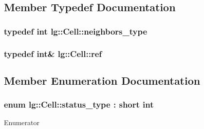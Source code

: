 \subsection{Member Typedef Documentation}
\subsubsection[{\texorpdfstring{neighbors\+\_\+type}{neighbors_type}}]{\setlength{\rightskip}{0pt plus 5cm}typedef int {\bf lg\+::\+Cell\+::neighbors\+\_\+type}}\hypertarget{classlg_1_1Cell_aa88691e430082878fa8092c25865ab53}{}\label{classlg_1_1Cell_aa88691e430082878fa8092c25865ab53}
\subsubsection[{\texorpdfstring{ref}{ref}}]{\setlength{\rightskip}{0pt plus 5cm}typedef int\& {\bf lg\+::\+Cell\+::ref}}\hypertarget{classlg_1_1Cell_a6b1da298dc7e18f248793dad5a08942a}{}\label{classlg_1_1Cell_a6b1da298dc7e18f248793dad5a08942a}


\subsection{Member Enumeration Documentation}
\subsubsection[{\texorpdfstring{status\+\_\+type}{status_type}}]{\setlength{\rightskip}{0pt plus 5cm}enum {\bf lg\+::\+Cell\+::status\+\_\+type} \+: short int\hspace{0.3cm}{\ttfamily [strong]}}\hypertarget{classlg_1_1Cell_a10376a213d664b96708f0d1e6d512f20}{}\label{classlg_1_1Cell_a10376a213d664b96708f0d1e6d512f20}
\begin{Desc}
\item[Enumerator]\par
\begin{description}
\item[{\em 
D\+E\+AD\hypertarget{classlg_1_1Cell_a10376a213d664b96708f0d1e6d512f20abb4784231ff45108ee20bad16e4a2e8c}{}\label{classlg_1_1Cell_a10376a213d664b96708f0d1e6d512f20abb4784231ff45108ee20bad16e4a2e8c}
}]\item[{\em 
A\+L\+I\+VE\hypertarget{classlg_1_1Cell_a10376a213d664b96708f0d1e6d512f20a3bfa0eed9e858c516e816a519b2a82eb}{}\label{classlg_1_1Cell_a10376a213d664b96708f0d1e6d512f20a3bfa0eed9e858c516e816a519b2a82eb}
}]\end{description}
\end{Desc}


